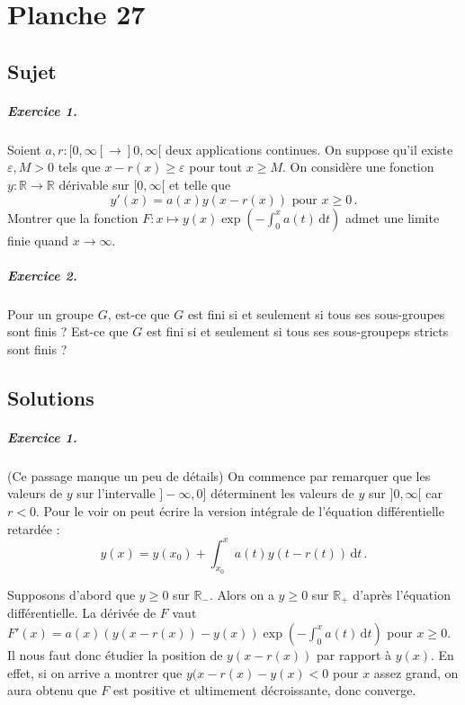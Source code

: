 \chapter{Planche 27}

\section{Sujet}

\paragraph{Exercice 1.}

Soient $a, r : [0,\infty[ \to ]0, \infty[$ deux applications continues. On suppose qu'il existe $\varepsilon, M >0$ tels que $x-r(x) \geqslant \varepsilon$ pour tout $x \geqslant M$. On considère une fonction $y : \mathbb{R} \to \mathbb{R}$ dérivable sur $[0,\infty[$ et telle que 
\[y'(x)=a(x)y(x-r(x)) \text{ pour } x \geqslant 0\,.\]
Montrer que la fonction $F : x \mapsto y(x) \exp \left(-\int_0^xa(t)\,\mathrm{d}t\right)$ admet une limite finie quand $x \to \infty$. 

\paragraph{Exercice 2.}

Pour un groupe $G$, est-ce que $G$ est fini si et seulement si tous ses sous-groupes sont finis ? Est-ce que $G$ est fini si et seulement si tous ses sous-groupeps stricts sont finis ? 

\section{Solutions}

\paragraph{Exercice 1.}

(Ce passage manque un peu de détails) On commence par remarquer que les valeurs de $y$ sur l'intervalle $]-\infty,0]$ déterminent les valeurs de $y$ sur $]0,\infty[$ car $r<0$. Pour le voir on peut écrire la version intégrale de l'équation différentielle retardée :
\[y(x)=y(x_0)+\int_{x_0}^xa(t)y(t-r(t))\,\mathrm{d}t\,.\]

Supposons d'abord que $y\geqslant 0$ sur $\mathbb{R}_-$. Alors on a $y \geqslant 0$ sur $\mathbb{R}_+$ d'après l'équation différentielle. La dérivée de $F$ vaut $F'(x)=a(x)(y(x-r(x))-y(x))\exp \left(-\int_0^x a(t)\,\mathrm{d}t\right)$ pour $x \geqslant 0$. Il nous faut donc étudier la position de $y(x-r(x))$ par rapport à $y(x)$. En effet, si on arrive a montrer que $y(x-r(x)-y(x)<0$ pour $x$ assez grand, on aura obtenu que $F$ est positive et ultimement décroissante, donc converge.


